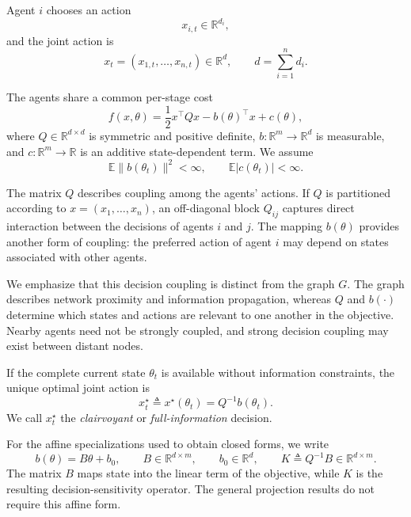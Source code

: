 \documentclass[11pt]{article}
\begin{document}
Agent $i$ chooses an action
\[
    x_{i,t}\in\mathbb{R}^{d_i},
\]
and the joint action is
\begin{equation}
    x_t
    =
    (x_{1,t},\ldots,x_{n,t})
    \in\mathbb{R}^{d},
    \qquad
    d=\sum_{i=1}^{n}d_i .
    \label{eq:joint_action}
\end{equation}

The agents share a common per-stage cost
\begin{equation}
    f(x,\theta)
    =
    \frac{1}{2}x^\top Qx
    -
    b(\theta)^\top x
    +
    c(\theta),
    \label{eq:quadratic_cost}
\end{equation}
where $Q\in\mathbb{R}^{d\times d}$ is symmetric and positive definite,
$b:\mathbb{R}^{m}\rightarrow\mathbb{R}^{d}$ is measurable, and
$c:\mathbb{R}^{m}\rightarrow\mathbb{R}$ is an additive state-dependent term.
We assume
\begin{equation}
    \mathbb{E}\|b(\theta_t)\|^2<\infty,
    \qquad
    \mathbb{E}|c(\theta_t)|<\infty.
    \label{eq:cost_integrability}
\end{equation}

The matrix $Q$ describes coupling among the agents' actions. If $Q$ is
partitioned according to $x=(x_1,\ldots,x_n)$, an off-diagonal block
$Q_{ij}$ captures direct interaction between the decisions of agents $i$ and
$j$. The mapping $b(\theta)$ provides another form of coupling: the preferred
action of agent $i$ may depend on states associated with other agents.

We emphasize that this decision coupling is distinct from the graph $G$.
The graph describes network proximity and information propagation, whereas
$Q$ and $b(\cdot)$ determine which states and actions are relevant to one
another in the objective. Nearby agents need not be strongly coupled, and
strong decision coupling may exist between distant nodes.

If the complete current state $\theta_t$ is available without information
constraints, the unique optimal joint action is
\begin{equation}
    x_t^\star
    \triangleq
    x^\star(\theta_t)
    =
    Q^{-1}b(\theta_t).
    \label{eq:clairvoyant}
\end{equation}
We call $x_t^\star$ the \emph{clairvoyant} or \emph{full-information}
decision.

For the affine specializations used to obtain closed forms, we write
\begin{equation}
    b(\theta)=B\theta+b_0,
    \qquad
    B\in\mathbb{R}^{d\times m},
    \qquad
    b_0\in\mathbb{R}^{d},
    \qquad
    K\triangleq Q^{-1}B\in\mathbb{R}^{d\times m}.
    \label{eq:affine_map_and_sensitivity}
\end{equation}
The matrix $B$ maps state into the linear term of the objective, while $K$ is
the resulting decision-sensitivity operator. The general projection results do
not require this affine form.
\end{document}
